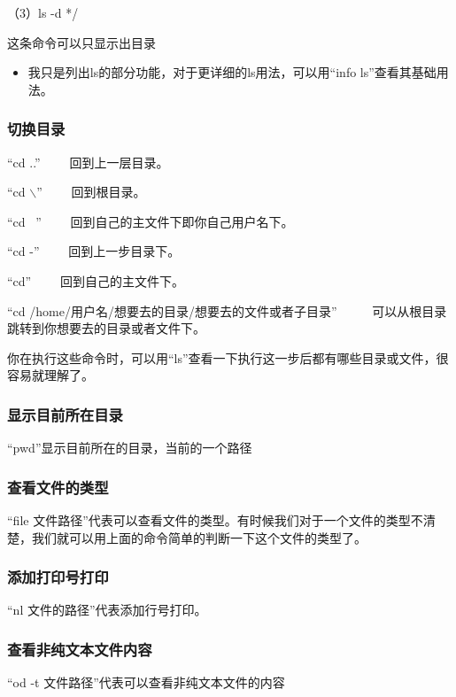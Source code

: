 \documentclass{article}
\begin{document}
（3）ls -d */

这条命令可以只显示出目录
\begin{itemize}
\item 我只是列出ls的部分功能，对于更详细的ls用法，可以用“info ls”查看其基础用法。
\end{itemize}
\subsubsection{切换目录}
“cd ..” ~~~~回到上一层目录。

“cd $\backslash$”  ~~~~回到根目录。

“cd ~”  ~~~~回到自己的主文件下即你自己用户名下。

“cd -”  ~~~~回到上一步目录下。

“cd”    ~~~~回到自己的主文件下。

“cd /home/用户名/想要去的目录/想要去的文件或者子目录”  ~~~~~可以从根目录跳转到你想要去的目录或者文件下。

你在执行这些命令时，可以用“ls”查看一下执行这一步后都有哪些目录或文件，很容易就理解了。
\subsubsection{显示目前所在目录}

“pwd”显示目前所在的目录，当前的一个路径


\subsubsection{查看文件的类型}
“file 文件路径”代表可以查看文件的类型。有时候我们对于一个文件的类型不清楚，我们就可以用上面的命令简单的判断一下这个文件的类型了。
\subsubsection{添加打印号打印}
“nl 文件的路径”代表添加行号打印。
\subsubsection{查看非纯文本文件内容} 
“od -t 文件路径”代表可以查看非纯文本文件的内容
\end{document}
